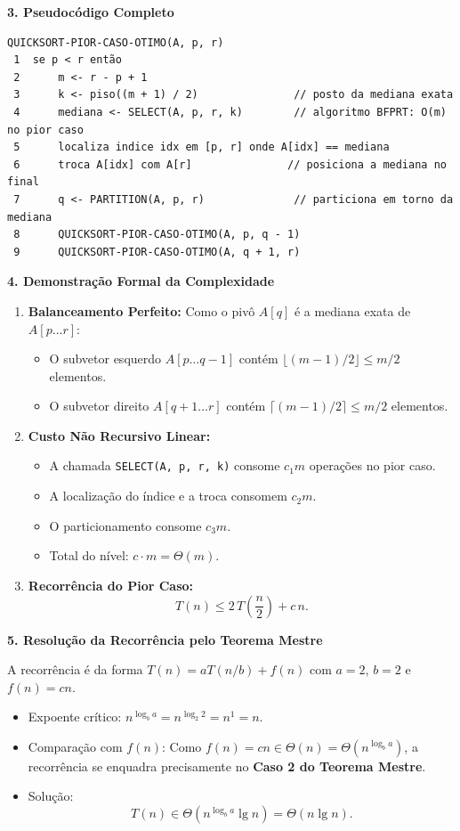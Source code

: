 \documentclass[11pt,a4paper]{article}
\newcommand{\topico}[1]{\par\medskip\textbf{\color{azul}#1}\par}
\begin{document}
\topico{3. Pseudocódigo Completo}
\begin{lstlisting}
QUICKSORT-PIOR-CASO-OTIMO(A, p, r)
 1  se p < r então
 2      m <- r - p + 1
 3      k <- piso((m + 1) / 2)               // posto da mediana exata
 4      mediana <- SELECT(A, p, r, k)        // algoritmo BFPRT: O(m) no pior caso
 5      localiza indice idx em [p, r] onde A[idx] == mediana
 6      troca A[idx] com A[r]               // posiciona a mediana no final
 7      q <- PARTITION(A, p, r)              // particiona em torno da mediana
 8      QUICKSORT-PIOR-CASO-OTIMO(A, p, q - 1)
 9      QUICKSORT-PIOR-CASO-OTIMO(A, q + 1, r)
\end{lstlisting}

\topico{4. Demonstração Formal da Complexidade}
\begin{enumerate}
    \item \textbf{Balanceamento Perfeito:} Como o pivô $A[q]$ é a mediana exata de $A[p \dots r]$:
    \begin{itemize}
        \item O subvetor esquerdo $A[p \dots q-1]$ contém $\lfloor (m - 1)/2 \rfloor \le m/2$ elementos.
        \item O subvetor direito $A[q+1 \dots r]$ contém $\lceil (m - 1)/2 \rceil \le m/2$ elementos.
    \end{itemize}
    \item \textbf{Custo Não Recursivo Linear:}
    \begin{itemize}
        \item A chamada \texttt{SELECT(A, p, r, k)} consome $c_1 m$ operações no pior caso.
        \item A localização do índice e a troca consomem $c_2 m$.
        \item O particionamento consome $c_3 m$.
        \item Total do nível: $c \cdot m = \Theta(m)$.
    \end{itemize}
    \item \textbf{Recorrência do Pior Caso:}
    \[
    T(n) \le 2\,T\left(\frac{n}{2}\right) + c\,n.
    \]
\end{enumerate}

\topico{5. Resolução da Recorrência pelo Teorema Mestre}
A recorrência é da forma $T(n) = a T(n/b) + f(n)$ com $a = 2$, $b = 2$ e $f(n) = cn$.
\begin{itemize}
    \item Expoente crítico: $n^{\log_b a} = n^{\log_2 2} = n^1 = n$.
    \item Comparação com $f(n)$: Como $f(n) = cn \in \Theta(n) = \Theta(n^{\log_b a})$, a recorrência se enquadra precisamente no \textbf{Caso 2 do Teorema Mestre}.
    \item Solução:
    \[
    T(n) \in \Theta(n^{\log_b a} \lg n) = \Theta(n \lg n).
    \]
\end{itemize}
\end{document}
